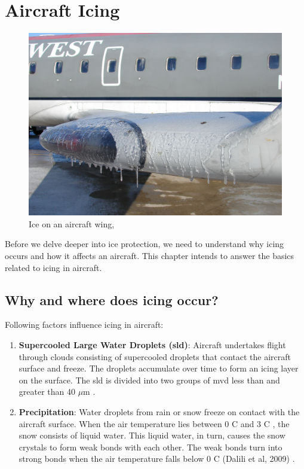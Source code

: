\documentclass[english]{kththesis}
\begin{document}
\cleardoublepage
\chapter{Aircraft Icing}
\begin{figure}[!ht]
    \centering
\graphicspath{ {IPS/} }
\includegraphics[width=\textwidth,height=\textheight,keepaspectratio]{Ice_on_an_aircraft_wing}
\caption{Ice on an aircraft wing, \cite{icingpic}}
\label{fig:Aircraftice}
\end{figure}
Before we delve deeper into ice protection, we need to understand why icing occurs and how it affects an aircraft. This chapter intends to answer the basics related to icing in aircraft.
\section{Why and where does icing occur?}
\label{sec:whyicingoccurs}
Following factors influence icing in aircraft:
\begin{enumerate}
\item \textbf{Supercooled Large Water Droplets (\acrshort{sld})}: Aircraft undertakes flight through clouds consisting of supercooled droplets that contact the aircraft surface and freeze. The droplets accumulate over time to form an icing layer on the surface. The \acrshort{sld} is divided into two groups of \acrshort{mvd} less than and greater than 40 $\mu$m \cite{EuropeanAviationSafetyAgency2020}.
\item \textbf{Precipitation}: Water droplets from rain or snow freeze on contact with the aircraft surface. When the air temperature lies between 0 \degree C and 3 \degree C , the snow consists of liquid water. This liquid water, in turn, causes the snow crystals to form weak bonds with each other. The weak bonds turn into strong bonds when the air temperature falls below 0 \degree C (Dalili et al, 2009) \cite{Thorsson} \cite{Dalili2009}.
\end{enumerate}
\end{document}
